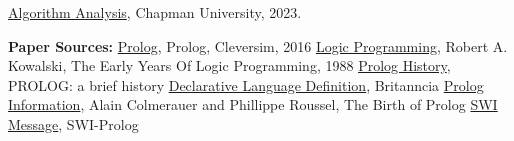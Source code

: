 \documentclass{article}
\theoremstyle{theorem}
\theoremstyle{definition}
\theoremstyle{remark}
\begin{document}
\begin{thebibliography}{99}
 \href{https://github.com/alexhkurz/algorithm-analysis-2023}{Algorithm Analysis}, Chapman University, 2023. \newline


\noindent\textbf{Paper Sources:} \newline
{} \href{https://www.cleverism.com/skills-and-tools/prolog/}{Prolog}, Prolog, Cleversim, 2016
 \href{http://www.doc.ic.ac.uk/~rak/papers/the%20early%20years.pdf}{Logic Programming}, Robert A. Kowalski, The Early Years Of Logic Programming, 1988
 \href{https://www.mta.ca/~rrosebru/oldcourse/371199/prolog/history.html#:~:text=1972%20is%20referred%20to%20by,interpreter%20was%20built%20by%20Roussel.}{Prolog History}, PROLOG: a brief history
 \href{https://www.britannica.com/technology/declarative-language}{Declarative Language Definition}, Britanncia 
 \href{https://dl.acm.org/doi/pdf/10.1145/234286.1057820}{Prolog Information}, Alain Colmerauer and Phillippe Roussel, The Birth of Prolog 
 \href{https://www.swi-prolog.org/}{SWI Message}, SWI-Prolog\newline


\end{thebibliography}
\end{document}

